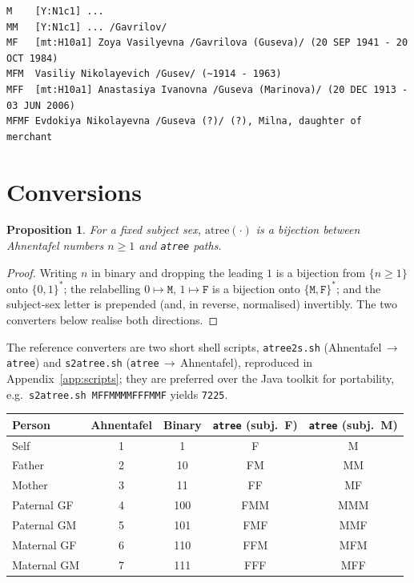 \documentclass[11pt]{article}
\newtheorem{proposition}{Proposition}
\newcommand{\atree}{\texttt{atree}}
\begin{document}
{\footnotesize\begin{verbatim}
M    [Y:N1c1] ...
MM   [Y:N1c1] ... /Gavrilov/
MF   [mt:H10a1] Zoya Vasilyevna /Gavrilova (Guseva)/ (20 SEP 1941 - 20 OCT 1984)
MFM  Vasiliy Nikolayevich /Gusev/ (~1914 - 1963)
MFF  [mt:H10a1] Anastasiya Ivanovna /Guseva (Marinova)/ (20 DEC 1913 - 03 JUN 2006)
MFMF Evdokiya Nikolayevna /Guseva (?)/ (?), Milna, daughter of merchant
\end{verbatim}}

\section{Conversions}
\label{sec:conversions}
\begin{proposition}\label{prop:bij}
For a fixed subject sex, $\mathrm{atree}(\cdot)$ is a bijection between Ahnentafel numbers $n\ge 1$
and \atree{} paths.
\end{proposition}
\begin{proof}
Writing $n$ in binary and dropping the leading $1$ is a bijection from $\{n\ge 1\}$ onto
$\{0,1\}^{*}$; the relabelling $0\mapsto\mathtt{M}$, $1\mapsto\mathtt{F}$ is a bijection onto
$\{\mathtt{M},\mathtt{F}\}^{*}$; and the subject-sex letter is prepended (and, in reverse,
normalised) invertibly. The two converters below realise both directions.
\end{proof}
The reference converters are two short shell scripts,
\texttt{atree2s.sh} (Ahnentafel\,$\to$\,\atree) and \texttt{s2atree.sh} (\atree\,$\to$\,Ahnentafel),
reproduced in Appendix~\ref{app:scripts}; they are preferred over the Java toolkit for portability,
e.g.\ \texttt{s2atree.sh MFFMMMMFFFMMF} yields \texttt{7225}.

\begin{center}
\begin{tabular}{lcccc}
\hline
Person & Ahnentafel & Binary & \atree{} (subj.\ F) & \atree{} (subj.\ M)\\
\hline
Self          & 1 & 1   & F   & M\\
Father        & 2 & 10  & FM  & MM\\
Mother        & 3 & 11  & FF  & MF\\
Paternal GF   & 4 & 100 & FMM & MMM\\
Paternal GM   & 5 & 101 & FMF & MMF\\
Maternal GF   & 6 & 110 & FFM & MFM\\
Maternal GM   & 7 & 111 & FFF & MFF\\
\hline
\end{tabular}
\end{center}
\end{document}
